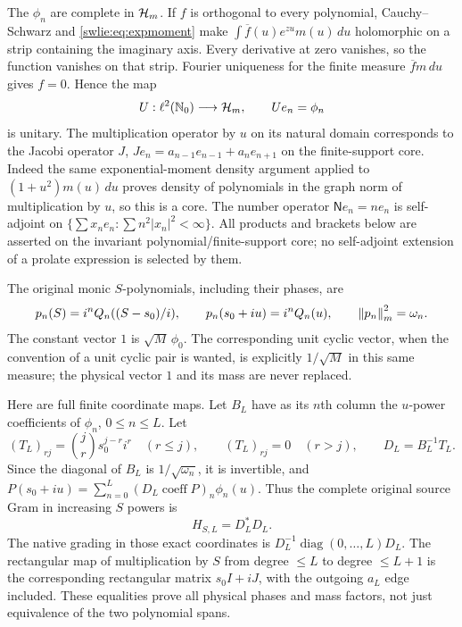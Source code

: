 The $\phi_n$ are complete in $\mathcal H_m$. If $f$ is orthogonal
to every polynomial, Cauchy--Schwarz and \eqref{swlie:eq:expmoment}
make $\int\overline f(u)e^{zu}m(u)\,du$ holomorphic on a
strip containing the imaginary axis. Every derivative at
zero vanishes, so the function vanishes on that strip.
Fourier uniqueness for the finite measure $\overline f m\,du$
gives $f=0$. Hence the map
\[
 U:\ell^2(\mathbb N_0)\longrightarrow\mathcal H_m,\qquad Ue_n=\phi_n
\]
is unitary. The multiplication operator by $u$ on its natural
domain corresponds to the Jacobi operator $J$,
$Je_n=a_{n-1}e_{n-1}+a_ne_{n+1}$ on the finite-support core.
Indeed the same exponential-moment density argument applied
to $(1+u^2)m(u)\,du$ proves density of polynomials in the
graph norm of multiplication by $u$, so this is a core.
The number operator $\mathsf N e_n=ne_n$ is self-adjoint
on $\{\sum x_ne_n:\sum n^2|x_n|^2<\infty\}$.
All products and brackets below are asserted on the
invariant polynomial/finite-support core; no self-adjoint
extension of a prolate expression is selected by them.

The original monic $S$-polynomials, including their phases, are
\begin{equation}\label{swlie:eq:physical-polys}
 p_n(S)=i^nQ_n((S-s_0)/i),\qquad
 p_n(s_0+iu)=i^nQ_n(u),\qquad \left\lVert p_n\right\rVert_m^2=\omega_n.
\end{equation}
The constant vector $1$ is $\sqrt M\,\phi_0$.
The corresponding unit cyclic vector, when the convention of
a unit cyclic pair is wanted, is explicitly $1/\sqrt M$
in this same measure; the physical vector $1$ and its mass
are never replaced.

Here are full finite coordinate maps. Let $B_L$ have as its
$n$th column the $u$-power coefficients of $\phi_n$, $0\leq n\leq L$.
Let
\begin{equation}\label{swlie:eq:coordinates}
 (T_L)_{rj}=\binom jr s_0^{j-r}i^r\quad(r\leq j),\qquad
 (T_L)_{rj}=0\quad(r>j),\qquad
 D_L=B_L^{-1}T_L.
\end{equation}
Since the diagonal of $B_L$ is $1/\sqrt{\omega_n}$,
it is invertible, and
$P(s_0+iu)=\sum_{n=0}^L(D_L\operatorname{coeff}P)_n\phi_n(u)$.
Thus the complete original source Gram in increasing $S$ powers is
\begin{equation}\label{swlie:eq:sourcegram}
 H_{S,L}=D_L^*D_L.
\end{equation}
The native grading in those exact coordinates is
$D_L^{-1}\operatorname{diag}(0,\ldots,L)D_L$.
The rectangular map of multiplication by $S$ from degree
$\leq L$ to degree $\leq L+1$ is the corresponding rectangular
matrix $s_0I+iJ$, with the outgoing $a_L$ edge included.
These equalities prove all physical phases and mass factors,
not just equivalence of the two polynomial spans.

